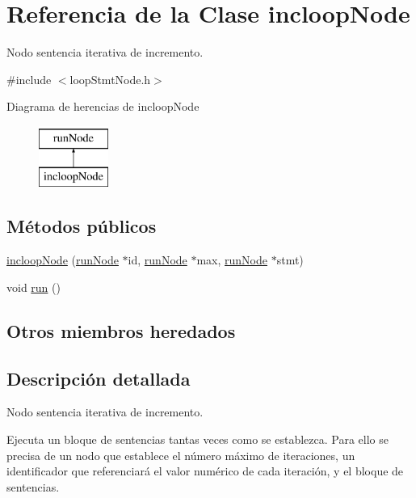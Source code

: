 \hypertarget{classincloopNode}{\section{Referencia de la Clase incloop\-Node}
\label{classincloopNode}
}


Nodo sentencia iterativa de incremento.  




{\ttfamily \#include $<$loop\-Stmt\-Node.\-h$>$}

Diagrama de herencias de incloop\-Node\begin{figure}[H]
\begin{center}
\leavevmode
\includegraphics[height=2.000000cm]{classincloopNode}
\end{center}
\end{figure}
\subsection*{Métodos públicos}
\begin{DoxyCompactItemize}
\item 
\hyperlink{classincloopNode_a6de0992c830a9ed142a39c6e03bbcd09}{incloop\-Node} (\hyperlink{classrunNode}{run\-Node} $\ast$id, \hyperlink{classrunNode}{run\-Node} $\ast$max, \hyperlink{classrunNode}{run\-Node} $\ast$stmt)
\item 
void \hyperlink{classincloopNode_a32835d32147f653d0f04cdf4e94b5180}{run} ()
\end{DoxyCompactItemize}
\subsection*{Otros miembros heredados}


\subsection{Descripción detallada}
Nodo sentencia iterativa de incremento. 

Ejecuta un bloque de sentencias tantas veces como se establezca. Para ello se precisa de un nodo que establece el número máximo de iteraciones, un identificador que referenciará el valor numérico de cada iteración, y el bloque de sentencias. 


